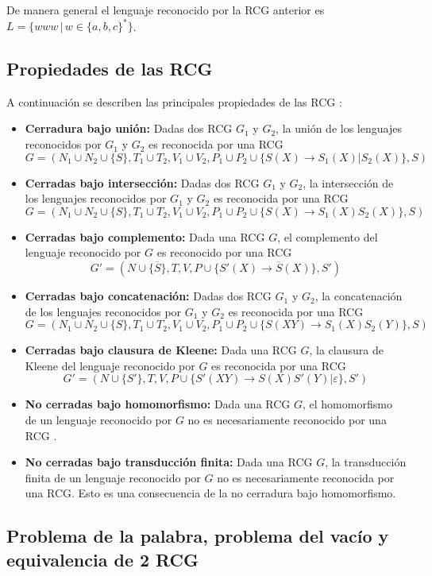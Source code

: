 \documentclass[12pt]{article}
\begin{document}
De manera general el lenguaje reconocido por la RCG anterior es $L=\{www\,|\,w\in \{a,b,c\}^*\}$.

\subsection{Propiedades de las RCG}

A continuación se describen las principales propiedades de las RCG \cite{propertiesRCGBib}:
\begin{itemize}
    \item \textbf{Cerradura bajo unión:} Dadas dos RCG $G_1$ y $G_2$, la unión de los lenguajes reconocidos por $G_1$ y $G_2$ es reconocida por una RCG
          $$G=(N_1\cup N_2\cup \{S\},T_1\cup T_2,V_1\cup V_2,P_1\cup P_2\cup \{S(X)\to S_1(X)|S_2(X)\},S)$$
    \item \textbf{Cerradas bajo intersección:} Dadas dos RCG $G_1$ y $G_2$, la intersección de los lenguajes reconocidos por $G_1$ y $G_2$ es reconocida por una RCG
          $$G=(N_1\cup N_2\cup \{S\},T_1\cup T_2,V_1\cup V_2,P_1\cup P_2\cup \{S(X)\to S_1(X)S_2(X)\},S)$$
    \item \textbf{Cerradas bajo complemento:} Dada una RCG $G$, el complemento del lenguaje reconocido por $G$ es reconocido por una RCG
          $$G'=(N\cup \{\overline{S}\},T,V,P\cup \{S'(X)\to \overline{S}(X)\},S')$$
    \item \textbf{Cerradas bajo concatenación:} Dadas dos RCG $G_1$ y $G_2$, la concatenación de los lenguajes reconocidos por $G_1$ y $G_2$ es reconocida por una RCG
          $$G=(N_1\cup N_2\cup \{S\},T_1\cup T_2,V_1\cup V_2,P_1\cup P_2\cup \{S(XY)\to S_1(X)S_2(Y)\},S)$$
    \item \textbf{Cerradas bajo clausura de Kleene:} Dada una RCG $G$, la clausura de Kleene del lenguaje reconocido por $G$ es reconocida por una RCG
          $$G'=(N\cup \{S'\},T,V,P\cup \{S'(XY)\to S(X)S'(Y)|\varepsilon\},S')$$
    \item  \textbf{No cerradas bajo homomorfismo:} Dada una RCG $G$, el homomorfismo de un lenguaje reconocido por $G$ no es necesariamente reconocido por una RCG \cite{propertiesRCGBib}.
    \item  \textbf{No cerradas bajo transducción finita:} Dada una RCG $G$, la transducción finita de un lenguaje reconocido por $G$ no es necesariamente reconocida por una RCG.
          Esto es una consecuencia de la no cerradura bajo homomorfismo.
\end{itemize}


\subsection{Problema de la palabra, problema del vacío y equivalencia de 2 RCG}
\end{document}
